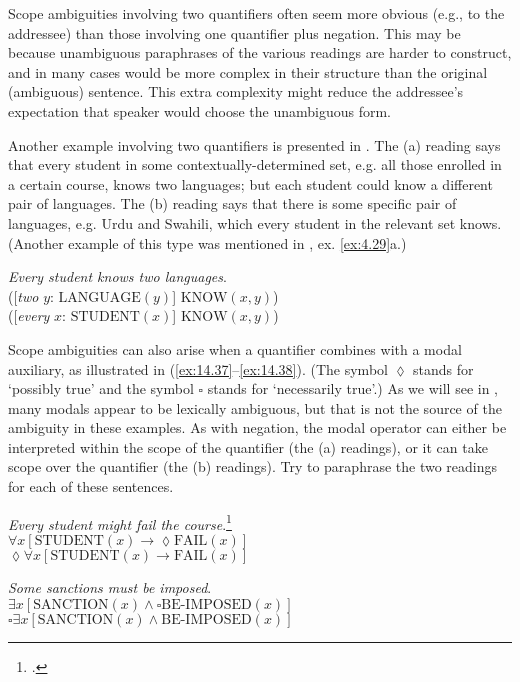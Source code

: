 {Scope ambiguities involving two quantifiers often seem more obvious (e.g., to the addressee) than those involving one quantifier plus negation. This may be because unambiguous paraphrases of the various readings are harder to construct, and in many cases would be more complex in their structure than the original (ambiguous) sentence. This extra complexity might reduce the addressee's expectation that speaker would choose the unambiguous form.


Another example involving two quantifiers is presented in . The (a) reading says that every student in some contextually-determined set, e.g. all those enrolled in a certain course, knows two languages; but each student could know a different pair of languages. The (b) reading says that there is some specific pair of languages, e.g.  Urdu and  Swahili, which every student in the relevant set knows. (Another example of this type was mentioned in , ex. \ref{ex:4.29}a.)


\ea \label{ex:14.36}
\textit{Every student knows two languages}.\\
 ([\textit{two} $y$:  $\text{LANGUAGE}(y)$] $\text{KNOW}(x, y)$)\\
 ([\textit{every} $x$: $\text{STUDENT}(x)$] $\text{KNOW}(x, y)$)
   \z
\z


Scope ambiguities can also arise when a quantifier combines with a modal auxiliary, as illustrated in (\ref{ex:14.37}--\ref{ex:14.38}). (The symbol ${\lozenge}$ stands for ‘possibly true’ and the symbol ${\square}$ stands for ‘necessarily true’.) As we will see in , many modals appear to be lexically ambiguous, but that is not the source of the ambiguity in these examples. As with negation, the modal operator can either be interpreted within the scope of the quantifier (the (a) readings), or it can take scope over the quantifier (the (b) readings). Try to paraphrase the two readings for each of these sentences.


\ea \label{ex:14.37}
\textit{Every student might fail the course}.\footnote{\citet[48]{Abbott2010}.}\\
\ea $\forall x[\text{STUDENT}(x) \rightarrow \lozenge \text{FAIL}(x)]$\\
\ex $\lozenge \forall x[\text{STUDENT}(x) \rightarrow \text{FAIL}(x)]$
\z 

\ex \label{ex:14.38}
\textit{Some sanctions must be imposed}.\\
\ea $\exists x[\text{SANCTION}(x) \wedge \square \text{BE-IMPOSED}(x)]$\\
\ex $\square \exists x[\text{SANCTION}(x) \wedge \text{BE-IMPOSED}(x)]$
\z \z


}
